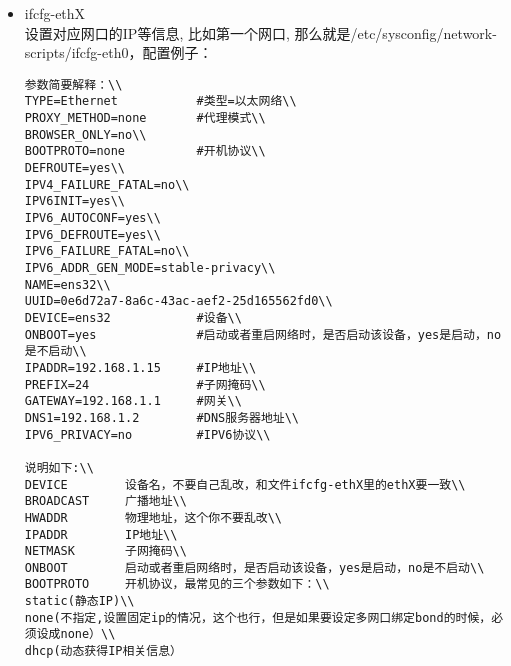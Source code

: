 \begin{itemize}
\item{ifcfg-ethX}\\
设置对应网口的IP等信息, 比如第一个网口, 那么就是/etc/sysconfig/network-scripts/ifcfg-eth0，配置例子：\\
\begin{verbatim}
参数简要解释：\\
TYPE=Ethernet           #类型=以太网络\\
PROXY_METHOD=none       #代理模式\\
BROWSER_ONLY=no\\
BOOTPROTO=none          #开机协议\\
DEFROUTE=yes\\
IPV4_FAILURE_FATAL=no\\
IPV6INIT=yes\\
IPV6_AUTOCONF=yes\\
IPV6_DEFROUTE=yes\\
IPV6_FAILURE_FATAL=no\\
IPV6_ADDR_GEN_MODE=stable-privacy\\
NAME=ens32\\
UUID=0e6d72a7-8a6c-43ac-aef2-25d165562fd0\\
DEVICE=ens32            #设备\\
ONBOOT=yes              #启动或者重启网络时，是否启动该设备，yes是启动，no是不启动\\
IPADDR=192.168.1.15     #IP地址\\
PREFIX=24               #子网掩码\\
GATEWAY=192.168.1.1     #网关\\
DNS1=192.168.1.2        #DNS服务器地址\\
IPV6_PRIVACY=no         #IPV6协议\\

说明如下:\\
DEVICE        设备名，不要自己乱改，和文件ifcfg-ethX里的ethX要一致\\
BROADCAST     广播地址\\
HWADDR        物理地址，这个你不要乱改\\
IPADDR        IP地址\\
NETMASK       子网掩码\\
ONBOOT        启动或者重启网络时，是否启动该设备，yes是启动，no是不启动\\
BOOTPROTO     开机协议，最常见的三个参数如下：\\
static(静态IP)\\
none(不指定,设置固定ip的情况，这个也行，但是如果要设定多网口绑定bond的时候，必须设成none）\\
dhcp(动态获得IP相关信息）
\end{verbatim}


\end{itemize}
